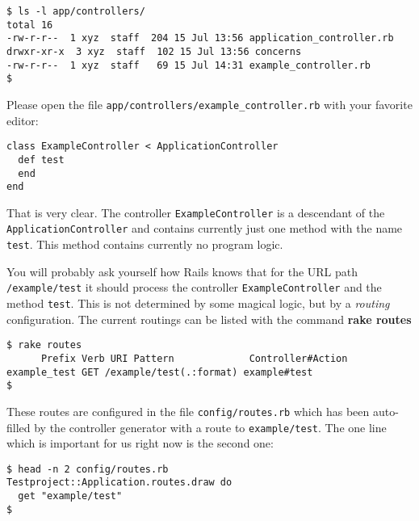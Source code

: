 \documentclass[a4paper]{book}
\begin{document}
\begin{shaded}\begin{verbatim}
$ ls -l app/controllers/
total 16
-rw-r-r--  1 xyz  staff  204 15 Jul 13:56 application_controller.rb
drwxr-xr-x  3 xyz  staff  102 15 Jul 13:56 concerns
-rw-r-r--  1 xyz  staff   69 15 Jul 14:31 example_controller.rb
$
\end{verbatim}\end{shaded}

Please open the file \texttt{app/controllers/example\_controller.rb} with your favorite editor:

\begin{shaded}\begin{verbatim}
class ExampleController < ApplicationController
  def test
  end
end
\end{verbatim}\end{shaded}

That is very clear. The controller \texttt{ExampleController} is a descendant of the \texttt{ApplicationController} and contains currently just one method with the name \texttt{test}. This method contains currently no program logic.

You will probably ask yourself how Rails knows that for the URL path \texttt{/example/test} it should process the controller \texttt{ExampleController} and the method \texttt{test}. This is not determined by some magical logic, but by a \emph{routing} configuration. The current routings can be listed with the command \textbf{rake routes}

\begin{shaded}\begin{verbatim}
$ rake routes
      Prefix Verb URI Pattern             Controller#Action
example_test GET /example/test(.:format) example#test
$
\end{verbatim}\end{shaded}

These routes are configured in the file \texttt{config/routes.rb} which has been auto-filled by the controller generator with a route to \texttt{example/test}. The one line which is important for us right now is the second one:

\begin{shaded}\begin{verbatim}
$ head -n 2 config/routes.rb
Testproject::Application.routes.draw do
  get "example/test"
$
\end{verbatim}\end{shaded}
\end{document}
